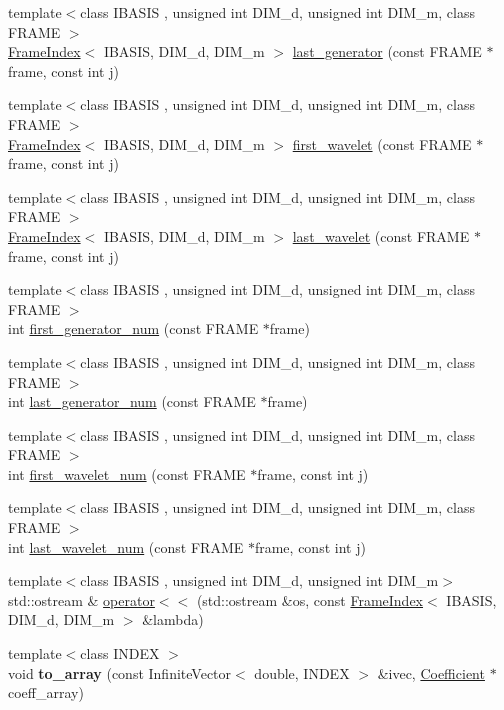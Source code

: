 \begin{CompactItemize}
\item 
{\footnotesize template$<$class IBASIS , unsigned int DIM\_\-d, unsigned int DIM\_\-m, class FRAME $>$ }\\\hyperlink{classFrameTL_1_1FrameIndex}{FrameIndex}$<$ IBASIS, DIM\_\-d, DIM\_\-m $>$ \hyperlink{namespaceFrameTL_a6650ac9337756c12f5022699c50cc28}{last\_\-generator} (const FRAME $\ast$frame, const int j)
\item 
{\footnotesize template$<$class IBASIS , unsigned int DIM\_\-d, unsigned int DIM\_\-m, class FRAME $>$ }\\\hyperlink{classFrameTL_1_1FrameIndex}{FrameIndex}$<$ IBASIS, DIM\_\-d, DIM\_\-m $>$ \hyperlink{namespaceFrameTL_ad2c37c6767c23fca5c2c3e1563680a5}{first\_\-wavelet} (const FRAME $\ast$frame, const int j)
\item 
{\footnotesize template$<$class IBASIS , unsigned int DIM\_\-d, unsigned int DIM\_\-m, class FRAME $>$ }\\\hyperlink{classFrameTL_1_1FrameIndex}{FrameIndex}$<$ IBASIS, DIM\_\-d, DIM\_\-m $>$ \hyperlink{namespaceFrameTL_7c29f890e91e2cd966b9ac6b773277cf}{last\_\-wavelet} (const FRAME $\ast$frame, const int j)
\item 
{\footnotesize template$<$class IBASIS , unsigned int DIM\_\-d, unsigned int DIM\_\-m, class FRAME $>$ }\\int \hyperlink{namespaceFrameTL_80cab15b10b2b3bff9e29f51409f7ce7}{first\_\-generator\_\-num} (const FRAME $\ast$frame)
\item 
{\footnotesize template$<$class IBASIS , unsigned int DIM\_\-d, unsigned int DIM\_\-m, class FRAME $>$ }\\int \hyperlink{namespaceFrameTL_0544af1a279910dc8bcdb9b542df3166}{last\_\-generator\_\-num} (const FRAME $\ast$frame)
\item 
{\footnotesize template$<$class IBASIS , unsigned int DIM\_\-d, unsigned int DIM\_\-m, class FRAME $>$ }\\int \hyperlink{namespaceFrameTL_d2a45d507a64c17ff1cf1edeb7afcd8e}{first\_\-wavelet\_\-num} (const FRAME $\ast$frame, const int j)
\item 
{\footnotesize template$<$class IBASIS , unsigned int DIM\_\-d, unsigned int DIM\_\-m, class FRAME $>$ }\\int \hyperlink{namespaceFrameTL_98345f161b05ac9604fbd9070da0bba7}{last\_\-wavelet\_\-num} (const FRAME $\ast$frame, const int j)
\item 
{\footnotesize template$<$class IBASIS , unsigned int DIM\_\-d, unsigned int DIM\_\-m$>$ }\\std::ostream \& \hyperlink{namespaceFrameTL_4f787a15e5a101207d222e0a799a7e5d}{operator$<$$<$} (std::ostream \&os, const \hyperlink{classFrameTL_1_1FrameIndex}{FrameIndex}$<$ IBASIS, DIM\_\-d, DIM\_\-m $>$ \&lambda)
\item 
\hypertarget{namespaceFrameTL_80a56eff444cfd2880b83403ab09e808}{
{\footnotesize template$<$class INDEX $>$ }\\void \textbf{to\_\-array} (const InfiniteVector$<$ double, INDEX $>$ \&ivec, \hyperlink{structFrameTL_1_1Coefficient}{Coefficient} $\ast$coeff\_\-array)}
\label{namespaceFrameTL_80a56eff444cfd2880b83403ab09e808}


\end{CompactItemize}
